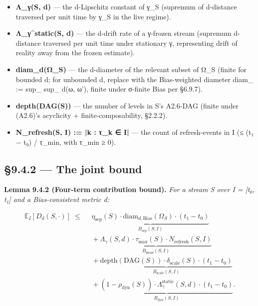 \documentclass[11pt, openany]{book}
\begin{document}
\begin{itemize}
\item \textbf{Λ\_\allowbreak{}γ(S, d)} --- the d-Lipschitz constant of γ\_\allowbreak{}S (supremum of d-distance traversed per unit time by γ\_\allowbreak{}S in the live regime).
\item \textbf{Λ\_\allowbreak{}γ\textasciicircum{}{static}(S, d)} --- the d-drift rate of a γ-frozen stream (supremum d-distance traversed per unit time under stationary γ, representing drift of reality away from the frozen estimate).
\item \textbf{diam\_\allowbreak{}d(Ω\_\allowbreak{}S)} --- the d-diameter of the relevant subset of Ω\_\allowbreak{}S (finite for bounded d; for unbounded d, replace with the Bias-weighted diameter diam\_ := sup\_ sup\_ d(ω, ω'), finite under σ-finite Bias per §6.9.7).
\item \textbf{depth(DAG(S))} --- the number of levels in S's A2.6-DAG (finite under (A2.6)'s acyclicity + finite-composability, §2.2.2).
\item \textbf{N\_\allowbreak{}refresh(S, I) := |{k : τ\_\allowbreak{}k ∈ I}|} --- the count of refresh-events in I (≤ (t₁ − t₀) / τ\_\allowbreak{}min, with τ\_\allowbreak{}min ≥ 0).
\end{itemize}

\subsection{§9.4.2 --- The joint bound}

\textbf{Lemma 9.4.2 (Four-term contribution bound).} \textit{For a stream S over I = [t₀, t₁] and a Bias-consistent metric d:}

\[
\begin{aligned}
\mathbb{E}_I[D_d(S, \cdot)] \;\leq\;\; & \underbrace{\eta_\mathrm{sep}(S) \cdot \mathrm{diam}_{d, \mathrm{Bias}}(\Omega_S) \cdot (t_1 - t_0)}_{B_\mathrm{sep}(S, I)} \\
& {} + \underbrace{\Lambda_\gamma(S, d) \cdot \tau_\mathrm{max}(S) \cdot N_\mathrm{refresh}(S, I)}_{B_\mathrm{meas}(S, I)} \\
& {} + \underbrace{\mathrm{depth}(\mathrm{DAG}(S)) \cdot \delta_\mathrm{scale}(S) \cdot (t_1 - t_0)}_{B_\mathrm{scale}(S, I)} \\
& {} + \underbrace{(1 - \rho_\mathrm{dyn}(S)) \cdot \Lambda_\gamma^\mathrm{static}(S, d) \cdot (t_1 - t_0)}_{B_\mathrm{dyn}(S, I)}.
\end{aligned}
\]
\end{document}
